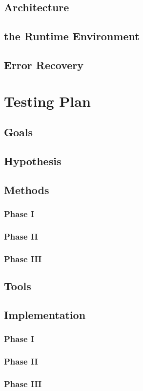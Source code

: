 \documentclass[letterpaper,11pt]{article}
\begin{document}
    \subsection{Architecture}
    \subsection{the Runtime Environment}
    \subsection{Error Recovery}

\section{Testing Plan}
    \subsection{Goals}
    \subsection{Hypothesis}
    \subsection{Methods}
        \subsubsection{Phase I}
        \subsubsection{Phase II}
        \subsubsection{Phase III}
    \subsection{Tools}
    \subsection{Implementation}
        \subsubsection{Phase I}
        \subsubsection{Phase II}
        \subsubsection{Phase III}
        
\end{document}
